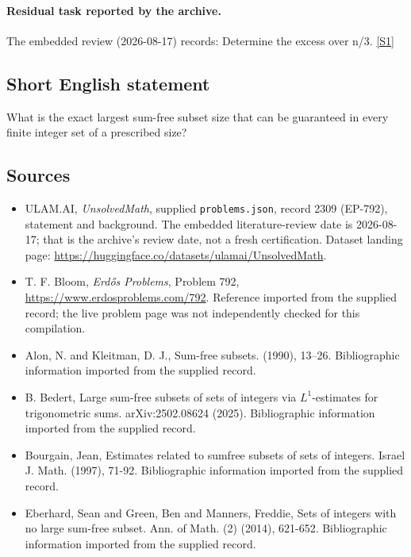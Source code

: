 \documentclass[11pt,a4paper]{article}
\newcommand{\sref}[2]{\hyperlink{source:#1:#2}{[S#2]}}
\begin{document}
\paragraph{Residual task reported by the archive.}

The embedded review (2026-08-17) records: Determine the excess over n/3. \sref{2309}{1}

\subsection{Short English statement}

What is the exact largest sum-free subset size that can be guaranteed in every finite integer set of a prescribed size?

\subsection{Sources}

{\small

\begin{itemize}

\item[\hypertarget{source:2309:1}{S1}] ULAM.AI, \emph{UnsolvedMath}, supplied \texttt{problems.json}, record 2309 (EP-792), statement and background. The embedded literature-review date is 2026-08-17; that is the archive’s review date, not a fresh certification. Dataset landing page: \url{https://huggingface.co/datasets/ulamai/UnsolvedMath}.

\item[\hypertarget{source:2309:2}{S2}] T. F. Bloom, \emph{Erdős Problems}, Problem 792, \url{https://www.erdosproblems.com/792}. Reference imported from the supplied record; the live problem page was not independently checked for this compilation.

\item[\hypertarget{source:2309:3}{S3}] Alon, N. and Kleitman, D. J., Sum-free subsets. (1990), 13--26. Bibliographic information imported from the supplied record.

\item[\hypertarget{source:2309:4}{S4}] B. Bedert, Large sum-free subsets of sets of integers via $L^1$-estimates for trigonometric sums. arXiv:2502.08624 (2025). Bibliographic information imported from the supplied record.

\item[\hypertarget{source:2309:5}{S5}] Bourgain, Jean, Estimates related to sumfree subsets of sets of integers. Israel J. Math. (1997), 71-92. Bibliographic information imported from the supplied record.

\item[\hypertarget{source:2309:6}{S6}] Eberhard, Sean and Green, Ben and Manners, Freddie, Sets of integers with no large sum-free subset. Ann. of Math. (2) (2014), 621-652. Bibliographic information imported from the supplied record.

\end{itemize}

}

\label{end:2309}
\end{document}
